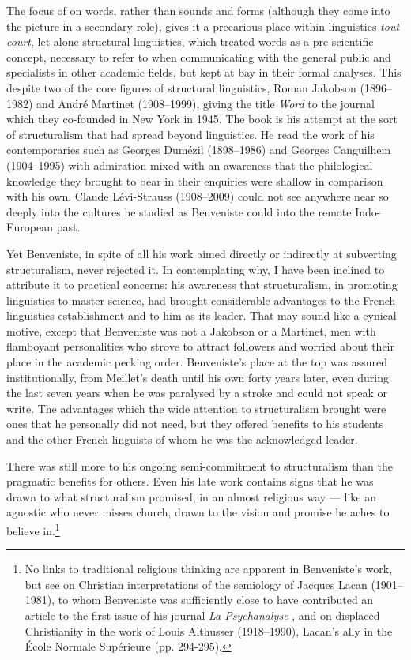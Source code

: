 \documentclass[output=paper]{langscibook}
\begin{document}
The focus of \citet{Benveniste1969vocabulaire} on words, rather than sounds and forms (although they come into the picture in a secondary role), gives it a precarious place within linguistics \emph{tout court}, let alone structural linguistics, which treated words as a pre-scientific concept, necessary to refer to when communicating with the general public and specialists in other academic fields, but kept at bay in their formal analyses. This despite two of the core figures of structural linguistics, Roman Jakobson (1896--1982) and André Martinet (1908--1999), giving the title \emph{Word} to the journal which they co-founded in New York in 1945. The \citeyear{Benveniste1969vocabulaire} book is his attempt at the sort of structuralism that had spread beyond linguistics. He read the work of his contemporaries such as Georges Dumézil (1898--1986) and Georges Canguilhem (1904--1995) with admiration mixed with an awareness that the philological knowledge they brought to bear in their enquiries were shallow in comparison with his own. Claude Lévi-Strauss (1908--2009) could not see anywhere near so deeply into the cultures he studied as Benveniste could into the remote Indo-European past.

Yet Benveniste, in spite of all his work aimed directly or indirectly at subverting structuralism, never rejected it. In contemplating why, I have been inclined to attribute it to practical concerns: his awareness that structuralism, in promoting linguistics to master science, had brought considerable advantages to the French linguistics establishment and to him as its leader. That may sound like a cynical motive, except that Benveniste was not a Jakobson or a Martinet, men with flamboyant personalities who strove to attract followers and worried about their place in the academic pecking order. Benveniste's place at the top was assured institutionally, from Meillet's death until his own forty years later, even during the last seven years when he was paralysed by a stroke and could not speak or write. The advantages which the wide attention to structuralism brought were ones that he personally did not need, but they offered benefits to his students and the other French linguists of whom he was the acknowledged leader.

There was still more to his ongoing semi-commitment to structuralism than the pragmatic benefits for others. Even his late work contains signs that he was drawn to what structuralism promised, in an almost religious way — like an agnostic who never misses church, drawn to the vision and promise he aches to believe in.\footnote{No links to traditional religious thinking are apparent in Benveniste's work, but see \citet[245--247]{Dosse1997} on Christian interpretations of the semiology of Jacques Lacan (1901--1981), to whom Benveniste was sufficiently close to have contributed an article to the first issue of his journal \emph{La Psychanalyse} \citep{Benveniste1956remarques}, and on displaced Christianity in the work of Louis Althusser (1918--1990), Lacan's ally in the École Normale Supérieure (pp. 294-295).}
\end{document}
